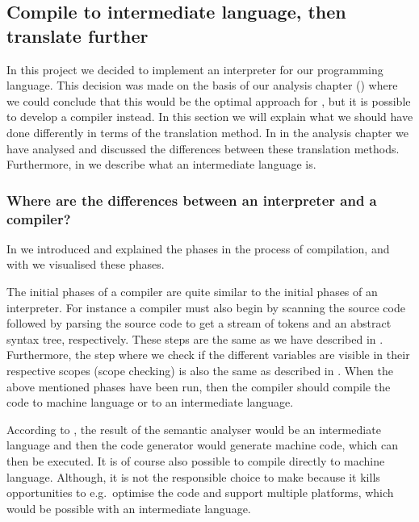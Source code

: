 \subsection{Compile to intermediate language, then translate further}
\label{sec:compiletointermediate}

In this project we decided to implement an interpreter for our programming
language. This decision was made on the basis of our analysis chapter
() where we could conclude that this would be the optimal
approach for \productname{}, but it is possible to develop a compiler instead. In
this section we will explain what we should have done differently in terms of
the translation method. In  in the
analysis chapter we have analysed and discussed the differences between these
translation methods. Furthermore, in  we
describe what an intermediate language is.

\subsubsection{Where are the differences between an interpreter and a compiler?}

In  we introduced and explained the phases in the
process of compilation, and with  we visualised
these phases.

The initial phases of a compiler are quite similar to the initial phases of an
interpreter. For instance a compiler must also begin by scanning the source code
followed by parsing the source code to get a stream of tokens and an abstract
syntax tree, respectively. These steps are the same as we have described in
. Furthermore, the step where we check if the
different variables are visible in their respective scopes (scope checking) is
also the same as described in . When the above
mentioned phases have been run, then the compiler should compile the code to
machine language or to an intermediate language.

According to , the result of the semantic
analyser would be an intermediate language and then the code generator
would generate machine code, which can then be executed. It is of course
also possible to compile directly to machine language. Although, it is
not the responsible choice to make because it kills opportunities to
e.g.\ optimise the code and support multiple platforms, which would be
possible with an intermediate language.

